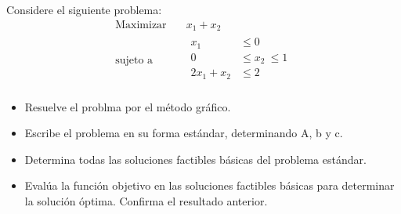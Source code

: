 \documentclass{article}
\begin{document}
Considere el siguiente problema:
\begin{equation*}
  \begin{aligned}
    \text{Maximizar}\quad & x_1+x_2 \\
    \text{sujeto a}\quad &
    \begin{aligned}
      x_1 & \leq 0\\
      0 & \leq x_2\ \leq 1\\
      2x_1+x_2 & \leq 2\\
    \end{aligned}
  \end{aligned}
\end{equation*}

\begin{itemize}
\item Resuelve el problma por el método gráfico.
\item Escribe el problema en su forma estándar, determinando A, b y c.
\item Determina todas las soluciones factibles básicas del problema estándar.
\item Evalúa la función objetivo en las soluciones factibles básicas para determinar la solución óptima. Confirma el resultado anterior.  
\end{itemize}
\end{document}
